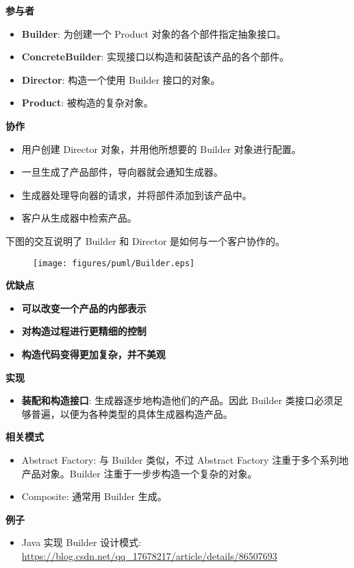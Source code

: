 \noindent\textbf{参与者}

\begin{itemize}
    \item \textbf{Builder}: 为创建一个 Product 对象的各个部件指定抽象接口。
    \item \textbf{ConcreteBuilder}: 实现接口以构造和装配该产品的各个部件。
    \item \textbf{Director}: 构造一个使用 Builder 接口的对象。
    \item \textbf{Product}: 被构造的复杂对象。
\end{itemize}

\noindent\textbf{协作}
\begin{itemize}
    \item 用户创建 Director 对象，并用他所想要的 Builder 对象进行配置。
    \item 一旦生成了产品部件，导向器就会通知生成器。
    \item 生成器处理导向器的请求，并将部件添加到该产品中。
    \item 客户从生成器中检索产品。
\end{itemize}

下图的交互说明了 Builder 和 Director 是如何与一个客户协作的。

\begin{figure}[H] 
    \centering 
    \texttt{[image: figures/puml/Builder.eps]} 
\end{figure}

\noindent\textbf{优缺点}
\begin{itemize}
    \item \textbf{可以改变一个产品的内部表示}
    \item \textbf{对构造过程进行更精细的控制}
    \item \textbf{构造代码变得更加复杂，并不美观}
\end{itemize}

\noindent\textbf{实现}
\begin{itemize}
    \item \textbf{装配和构造接口}: 生成器逐步地构造他们的产品。因此 Builder 类接口必须足够普遍，以便为各种类型的具体生成器构造产品。
\end{itemize}

\noindent\textbf{相关模式}
\begin{itemize}
    \item Abstract Factory: 与 Builder 类似，不过 Abstract Factory 注重于多个系列地产品对象。Builder 注重于一步步构造一个复杂的对象。
    \item Composite: 通常用 Builder 生成。
\end{itemize}

\noindent\textbf{例子}
\begin{itemize}
    \item Java 实现 Builder 设计模式: \url{https://blog.csdn.net/qq_17678217/article/details/86507693} 
\end{itemize}



\newpage